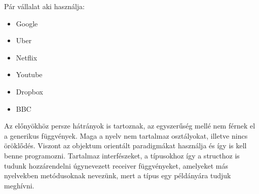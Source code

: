 Pár vállalat aki használja:
\begin{itemize}
    \item Google %
    \item Uber %
    \item Netflix %
    \item Youtube %
    \item Dropbox %
    \item BBC %
\end{itemize}

Az előnyökhöz persze hátrányok is tartoznak, az egyszerűség mellé nem férnek el a generikus függvények.
Maga a nyelv nem tartalmaz osztályokat, illetve nincs öröklődés.
Viszont az objektum orientált paradigmákat használja és így is kell benne programozni.
Tartalmaz interfészeket, a típusokhoz így a structhoz is tudunk hozzárendelni úgynevezett receiver függvényeket, amelyeket más nyelvekben metódusoknak nevezünk, mert a típus egy példányára tudjuk meghívni.

